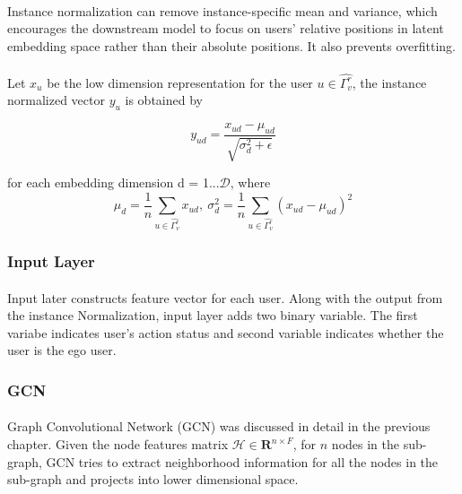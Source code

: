 \paragraph{} Instance normalization can remove instance-specific mean and variance, which encourages the downstream model 
to focus on users’ relative positions in latent embedding space rather than their absolute positions. It also prevents 
overfitting.

\paragraph{} Let $x_u$ be the low dimension representation for the user $u \in \hat{\Gamma_v^r}$, the instance normalized
vector $y_u$ is obtained by

\begin{equation}
    y_{ud} = \frac{x_{ud}-\mu_{ud}}{\sqrt{\sigma_d^2+\epsilon}}
\end{equation}

for each embedding dimension d = 1...$\mathcal{D}$, where 
\begin{equation}
    \mu_d = \frac{1}{n}\sum_{u \in \hat{\Gamma_v^r}}x_{ud},\ \sigma_d^2 = \frac{1}{n}\sum_{u \in \hat{\Gamma_v^r}}(x_{ud}-\mu_{ud})^2
\end{equation}


\subsubsection{Input Layer}

\paragraph{} Input later constructs feature vector for each user. Along with the output from the instance Normalization,
input layer adds two binary variable. The first variabe indicates user's action status and second variable indicates whether
the user is the ego user.

\subsubsection{GCN}

\paragraph{} Graph Convolutional Network (GCN) was discussed in detail in the previous chapter. Given the node features 
matrix $\mathcal{H} \in \mathbf{R}^{n \times F}$, for $n$ nodes in the sub-graph, GCN tries to extract neighborhood 
information for all the nodes in the sub-graph and projects into lower dimensional space.

